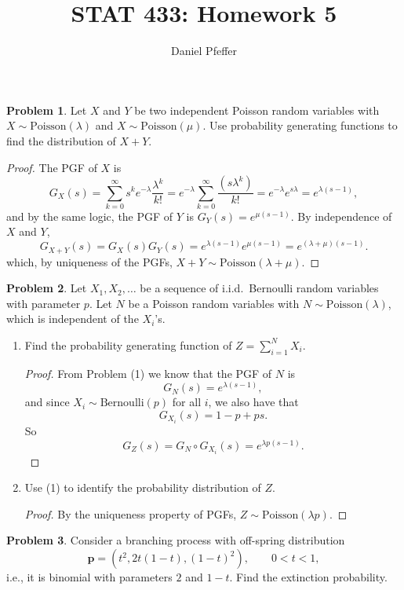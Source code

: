 \documentclass[oneside,reqno]{amsart}
\title{STAT 433: Homework 5}
\author{Daniel Pfeffer}
\newcommand{\Pois}{\mathrm{Poisson}}
\newcommand{\Ber}{\mathrm{Bernoulli}}
\theoremstyle{definition}
\newtheorem{prob}{Problem}
\begin{document}
\maketitle

\begin{prob}
Let $X$ and $Y$ be two independent Poisson random variables with $X \sim \Pois(\lambda)$ and $X \sim \Pois(\mu)$. Use probability generating functions to find the distribution of $X+Y$. 
\end{prob}

\begin{proof}
The PGF of $X$ is
\[
	G_X(s) = \sum_{k=0}^\infty s^k e^{-\lambda} \frac{\lambda^k}{k!} = e^{-\lambda} \sum_{k=0}^\infty \frac{(s\lambda^k)}{k!} = e^{-\lambda} e^{s\lambda} = e^{\lambda(s-1)},
\]
and by the same logic, the PGF of $Y$ is $G_Y(s) =  e^{\mu(s-1)}$. By independence of $X$ and $Y$,
\[
	G_{X+Y}(s) = G_X(s)G_Y(s) = e^{\lambda(s-1)}e^{\mu(s-1)} = e^{(\lambda + \mu)(s-1)}.
\]
which, by uniqueness of the PGFs, $X+Y\sim \Pois(\lambda + \mu)$.
\end{proof}

\begin{prob}
Let $X_1, X_2, \dotsc$ be a sequence of i.i.d.\ Bernoulli random variables with parameter $p$. Let $N$ be a Poisson random variables with $N \sim \Pois(\lambda)$, which is independent of the $X_i$'s. 
\end{prob}

\begin{enumerate}
\item
Find the probability generating function of $Z=\sum_{i=1}^N X_i$.
\begin{proof}
From Problem (1) we know that the PGF of $N$ is 
\[
	G_N(s) = e^{\lambda(s-1)}, 
\]
and since $X_i \sim \Ber(p)$ for all $i$, we also have that
\[
	G_{X_i}(s) = 1-p + ps.
\]
So
\[
	G_Z(s) = G_N \circ G_{X_i}(s) = e^{\lambda p(s-1)}.
\]
\end{proof}

\item
Use (1) to identify the probability distribution of $Z$.  
\begin{proof}
By the uniqueness property of PGFs, $Z \sim \Pois(\lambda p)$.
\end{proof}
\end{enumerate}


\begin{prob}
Consider a branching process with off-spring distribution 
\[
	\mathbf p = \left(t^2, 2t(1-t), (1-t)^2\right), \qquad 0 < t < 1,
\]	
i.e., it is binomial with parameters $2$ and $1-t$. Find the extinction probability. 
\end{prob}
\end{document}
